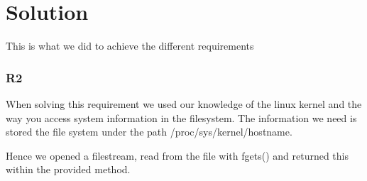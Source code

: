 \chapter{Solution}
This is what we did to achieve the different requirements

\subsection{R2}
When solving this requirement we used our knowledge of the linux kernel and the way you access system information in the filesystem. The information we need is stored the file system under the path /proc/sys/kernel/hostname.

Hence we opened a filestream, read from the file with fgets() and returned this within the provided method.